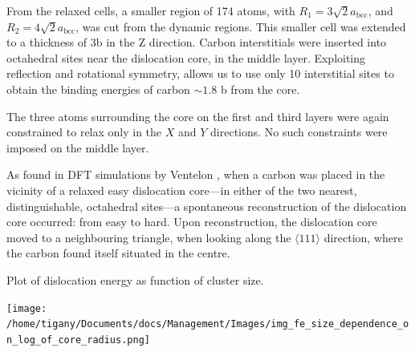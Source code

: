\documentclass[a4paper]{article}
\begin{document}
From the relaxed cells, a smaller region of 174 atoms, with \(R_1 =
   3\sqrt{2}a_{\text{bcc}}\), and \(R_2 = 4\sqrt{2}a_{\text{bcc}}\), was cut from
the dynamic regions. This smaller cell was extended to a thickness of 3b in
the Z direction. Carbon interstitials were inserted into octahedral sites
near the dislocation core, in the middle layer. Exploiting reflection and
rotational symmetry, allows us to use only 10 interstitial
sites to obtain the binding energies of carbon \(\sim 1.8\) b from the core. 

The three atoms surrounding the core on the first and third layers were again
constrained to relax only in the \(X\) and \(Y\) directions. No such constraints
were imposed on the middle layer. 


As found in DFT simulations by Ventelon \cite{Ventelon2015}, when a carbon was placed in the
vicinity of a relaxed easy dislocation core---in either of the two nearest, distinguishable,
octahedral sites---a spontaneous reconstruction of the dislocation core occurred: from easy to
hard. Upon reconstruction, the dislocation core moved to a neighbouring triangle, when looking along the \(\langle
   111\rangle\) direction, where the carbon found itself situated in the centre.


Plot of dislocation energy as function of cluster size. 
\begin{center}
\texttt{[image: /home/tigany/Documents/docs/Management/Images/img\_fe\_size\_dependence\_on\_log\_of\_core\_radius.png]}
\end{center}
\end{document}
